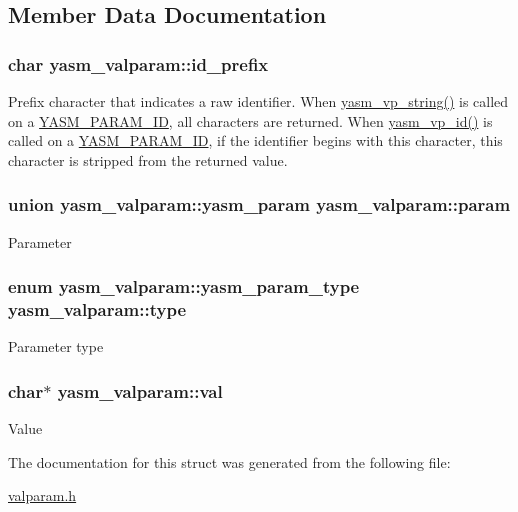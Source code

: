 \subsection{Member Data Documentation}
\hypertarget{structyasm__valparam_a49717972935d5096a239b8c3f1e35462}{
\subsubsection[{id\-\_\-prefix}]{\setlength{\rightskip}{0pt plus 5cm}char yasm\-\_\-valparam\-::id\-\_\-prefix}}\label{structyasm__valparam_a49717972935d5096a239b8c3f1e35462}
Prefix character that indicates a raw identifier. When \hyperlink{valparam_8h_a055c3e4ce5ba9c3f58f4fcf66016ce7f}{yasm\-\_\-vp\-\_\-string()} is called on a \hyperlink{structyasm__valparam_a3eefe852f229cec9d65ada6450484b86a197ce66261f2807125fcfdc84b3a9216}{Y\-A\-S\-M\-\_\-\-P\-A\-R\-A\-M\-\_\-\-I\-D}, all characters are returned. When \hyperlink{valparam_8h_adfb358f966787153fdcf8b9a72ec8c39}{yasm\-\_\-vp\-\_\-id()} is called on a \hyperlink{structyasm__valparam_a3eefe852f229cec9d65ada6450484b86a197ce66261f2807125fcfdc84b3a9216}{Y\-A\-S\-M\-\_\-\-P\-A\-R\-A\-M\-\_\-\-I\-D}, if the identifier begins with this character, this character is stripped from the returned value. \hypertarget{structyasm__valparam_a44bf972817e5c701378245bd59e14b29}{
\subsubsection[{param}]{\setlength{\rightskip}{0pt plus 5cm}union {\bf yasm\-\_\-valparam\-::yasm\-\_\-param}  yasm\-\_\-valparam\-::param}}\label{structyasm__valparam_a44bf972817e5c701378245bd59e14b29}
Parameter \hypertarget{structyasm__valparam_a11e24b3f5e61c691e1f4baa2450fe409}{
\subsubsection[{type}]{\setlength{\rightskip}{0pt plus 5cm}enum {\bf yasm\-\_\-valparam\-::yasm\-\_\-param\-\_\-type}  yasm\-\_\-valparam\-::type}}\label{structyasm__valparam_a11e24b3f5e61c691e1f4baa2450fe409}
Parameter type \hypertarget{structyasm__valparam_a9fc5a862572728e35f63948e784ba9e5}{
\subsubsection[{val}]{\setlength{\rightskip}{0pt plus 5cm}char$\ast$ yasm\-\_\-valparam\-::val}}\label{structyasm__valparam_a9fc5a862572728e35f63948e784ba9e5}
Value 

The documentation for this struct was generated from the following file\-:\begin{DoxyCompactItemize}
\item 
\hyperlink{valparam_8h}{valparam.\-h}\end{DoxyCompactItemize}
